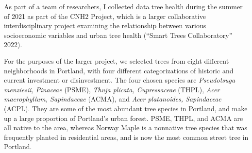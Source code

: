 \documentclass[12pt,twoside]{reedthesis}
\begin{document}
As part of a team of researchers, I collected data tree health during
the summer of 2021 as part of the CNH2 Project, which is a larger
collaborative interdisciplinary project examining the relationship
between various socioeconomic variables and urban tree health
({``Smart Trees Collaboratory''} 2022).

For the purposes of the larger project, we selected trees from eight
different neighborhoods in Portland, with four different categorizations
of historic and current investment or disinvestment. The four chosen
species are \emph{Pseudotsuga menziesii, Pinaceae} (PSME), \emph{Thuja plicata,
Cupressaceae} (THPL), \emph{Acer macrophyllum, Sapindaceae} (ACMA), and \emph{Acer
platanoides, Sapindaceae} (ACPL). They are some of the most abundant
tree species in Portland, and make up a large proportion of Portland's
urban forest. PSME, THPL, and ACMA are all native to the area, whereas
Norway Maple is a nonnative tree species that was frequently planted in
residential areas, and is now the most common street tree in Portland.
\end{document}
